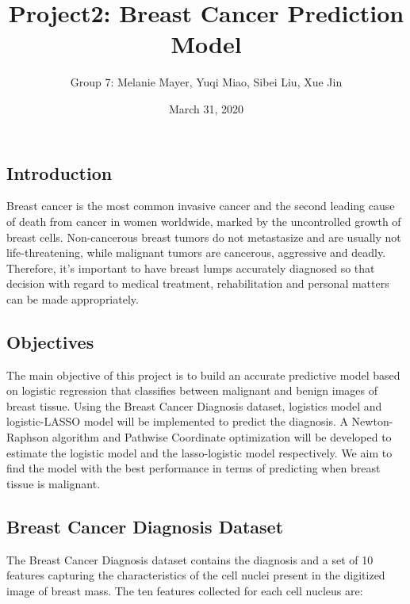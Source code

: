 \documentclass[]{article}
\title{Project2: Breast Cancer Prediction Model}
\author{Group 7: Melanie Mayer, Yuqi Miao, Sibei Liu, Xue Jin}
\date{March 31, 2020}
\begin{document}
\maketitle

\hypertarget{introduction}{%
\subsection{Introduction}\label{introduction}}

Breast cancer is the most common invasive cancer and the second leading
cause of death from cancer in women worldwide, marked by the
uncontrolled growth of breast cells. Non-cancerous breast tumors do not
metastasize and are usually not life-threatening, while malignant tumors
are cancerous, aggressive and deadly. Therefore, it's important to have
breast lumps accurately diagnosed so that decision with regard to
medical treatment, rehabilitation and personal matters can be made
appropriately.

\hypertarget{objectives}{%
\subsection{Objectives}\label{objectives}}

The main objective of this project is to build an accurate predictive
model based on logistic regression that classifies between malignant and
benign images of breast tissue. Using the Breast Cancer Diagnosis
dataset, logistics model and logistic-LASSO model will be implemented to
predict the diagnosis. A Newton-Raphson algorithm and Pathwise
Coordinate optimization will be developed to estimate the logistic model
and the lasso-logistic model respectively. We aim to find the model with
the best performance in terms of predicting when breast tissue is
malignant.

\hypertarget{breast-cancer-diagnosis-dataset}{%
\subsection{Breast Cancer Diagnosis
Dataset}\label{breast-cancer-diagnosis-dataset}}

The Breast Cancer Diagnosis dataset contains the diagnosis and a set of
10 features capturing the characteristics of the cell nuclei present in
the digitized image of breast mass. The ten features collected for each
cell nucleus are:
\end{document}

